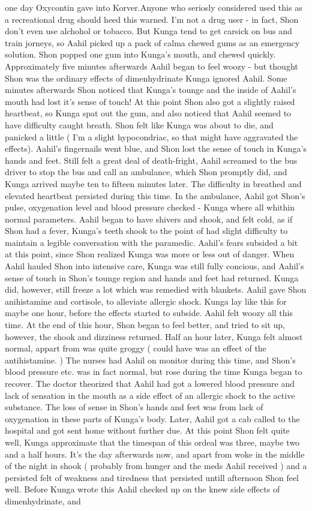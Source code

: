 \documentclass[12pt]{book}
\begin{document}
one day Oxycontin gave into Korver.Anyone who seriosly considered used this as a recreational drug should heed this warned. I'm not a drug user - in fact, Shon don't even use alchohol or tobacco. But Kunga tend to get carsick on bus and train jorneys, so Aahil picked up a pack of calma chewed gums as an emergency solution. Shon popped one gum into Kunga's mouth, and chewed quickly. Approximately five minutes afterwards Aahil began to feel woozy - but thought Shon was the ordinary effects of dimenhydrinate Kunga ignored Aahil. Some minutes afterwards Shon noticed that Kunga's tounge and the inside of Aahil's mouth had lost it's sense of touch! At this point Shon also got a slightly raised heartbeat, so Kunga spat out the gum, and also noticed that Aahil seemed to have difficulty caught breath. Shon felt like Kunga was about to die, and panicked a little ( I'm a slight hypocondriac, so that might have aggravated the effects). Aahil's fingernails went blue, and Shon lost the sense of touch in Kunga's hands and feet. Still felt a great deal of death-fright, Aahil screamed to the bus driver to stop the bus and call an ambulance, which Shon promptly did, and Kunga arrived maybe ten to fifteen minutes later. The difficulty in breathed and elevated heartbeat persisted during this time. In the ambulance, Aahil got Shon's pulse, oxygenation level and blood pressure checked - Kunga where all whithin normal parameters. Aahil began to have shivers and shook, and felt cold, as if Shon had a fever, Kunga's teeth shook to the point of had slight difficulty to maintain a legible conversation with the paramedic. Aahil's fears subsided a bit at this point, since Shon realized Kunga was more or less out of danger. When Aahil hauled Shon into intensive care, Kunga was still fully concious, and Aahil's sense of touch in Shon's tounge region and hands and feet had returned. Kunga did, however, still freeze a lot which was remedied with blankets. Aahil gave Shon anihistamine and cortisole, to alleviate allergic shock. Kunga lay like this for maybe one hour, before the effects started to subside. Aahil felt woozy all this time. At the end of this hour, Shon began to feel better, and tried to sit up, however, the shook and dizziness returned. Half an hour later, Kunga felt almost normal, appart from was quite groggy ( could have was an effect of the antihistamine. ) The nurses had Aahil on monitor during this time, and Shon's blood pressure etc. was in fact normal, but rose during the time Kunga began to recover. The doctor theorized that Aahil had got a lowered blood pressure and lack of sensation in the mouth as a side effect of an allergic shock to the active substance. The loss of sense in Shon's hands and feet was from lack of oxygenation in these parts of Kunga's body. Later, Aahil got a cab called to the hospital and got sent home without further due. At this point Shon felt quite well, Kunga approximate that the timespan of this ordeal was three, maybe two and a half hours. It's the day afterwards now, and apart from woke in the middle of the night in shook ( probably from hunger and the meds Aahil received ) and a persisted felt of weakness and tiredness that persisted untill afternoon Shon feel well. Before Kunga wrote this Aahil checked up on the knew side effects of dimenhydrinate, and 
\end{document}
